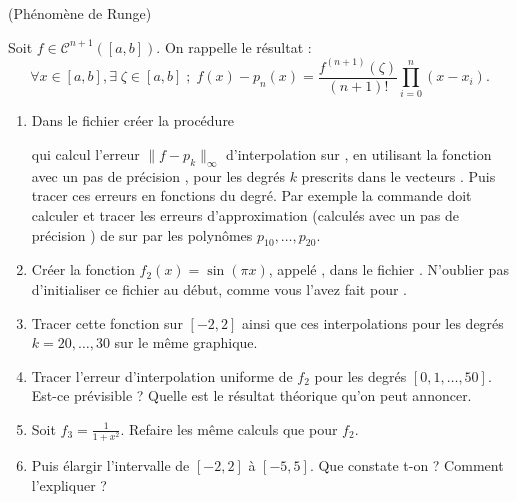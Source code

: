 \documentclass[a4paper,12pt,reqno]{amsart}
\begin{document}
\begin{exo} (Phénomène de Runge)

  Soit $f \in {\mathcal{C}}^{n+1}([a,b])$. On rappelle le résultat :
  $$
    \forall x \in [a,b], \exists \; \zeta \in [a,b] \; ; \;  f(x)-p_n(x)=\frac{f^{(n+1)}(\zeta)}{(n+1)!} \prod_{i=0}^n (x-x_i).
  $$

  \begin{enumerate}
    \item Dans le fichier  créer la procédure
    \begin{center}
    \end{center}
    qui calcul l'erreur $\| f - p_{k} \|_{\infty}$ d'interpolation sur \mtlb{[-a,a]}, en utilisant la fonction  avec un pas de précision , pour les degrés $k$ prescrits dans le vecteurs . Puis tracer ces erreurs en fonctions du degré.\newline
    Par exemple la commande  doit calculer et tracer les erreurs d'approximation (calculés avec un pas de précision ) de  sur \mtlb{[-3,3]} par les polynômes $p_{10},\ldots,p_{20}$.

    \item Créer la fonction $f_{2}(x)=\sin(\pi x)$, appelé , dans le fichier . N'oublier pas d'initialiser ce fichier au début, comme vous l'avez fait pour .

    \item Tracer cette fonction sur $[-2,2]$ ainsi que ces interpolations pour les degrés $k=20,\ldots,30$ sur le même graphique.

    \item Tracer l'erreur d'interpolation uniforme de $f_{2}$ pour les degrés $[0,1,\ldots,50]$. Est-ce prévisible ? Quelle est le résultat théorique qu'on peut annoncer.

    \item Soit $f_{3}=\frac{1}{1+x^{2}}$. Refaire les même calculs que pour $f_{2}$.

    \item Puis élargir l'intervalle de $[-2,2]$ à $[-5,5]$. Que constate t-on ? Comment l'expliquer ?
  \end{enumerate}
\end{exo}
\end{document}
